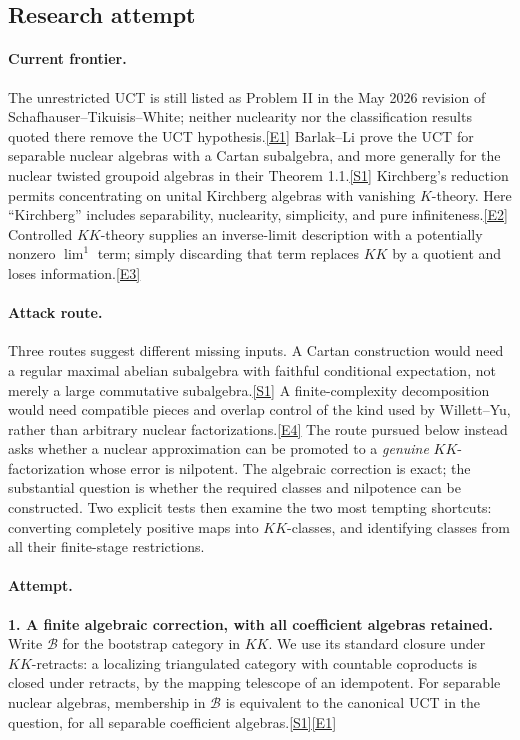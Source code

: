 \documentclass[11pt,a4paper]{article}
\newcommand{\sref}[2]{\hyperlink{source:#1:#2}{[S#2]}}
\newcommand{\eref}[2]{\hyperlink{extra:#1:#2}{[E#2]}}
\begin{document}
\subsection{Research attempt}

\paragraph{Current frontier.}
The unrestricted UCT is still listed as Problem II in the May 2026 revision
of Schafhauser--Tikuisis--White; neither nuclearity nor the classification
results quoted there remove the UCT hypothesis.\eref{statement}{1}
Barlak--Li prove the UCT for separable nuclear algebras with a Cartan
subalgebra, and more generally for the nuclear twisted groupoid algebras
in their Theorem 1.1.\sref{statement}{1}
Kirchberg's reduction permits concentrating on unital Kirchberg algebras
with vanishing $K$-theory. Here ``Kirchberg'' includes separability,
nuclearity, simplicity, and pure infiniteness.\eref{statement}{2}
Controlled $KK$-theory supplies an inverse-limit description with a
potentially nonzero $\lim^1$ term; simply discarding that term replaces
$KK$ by a quotient and loses information.\eref{statement}{3}

\paragraph{Attack route.}
Three routes suggest different missing inputs. A Cartan construction would
need a regular maximal abelian subalgebra with faithful conditional
expectation, not merely a large commutative subalgebra.\sref{statement}{1}
A finite-complexity decomposition would need compatible pieces and overlap
control of the kind used by Willett--Yu, rather than arbitrary nuclear
factorizations.\eref{statement}{4}
The route pursued below instead asks whether a nuclear approximation can
be promoted to a \emph{genuine} $KK$-factorization whose error is nilpotent.
The algebraic correction is exact; the substantial question is whether the
required classes and nilpotence can be constructed. Two explicit tests
then examine the two most tempting shortcuts: converting completely
positive maps into $KK$-classes, and identifying classes from all their
finite-stage restrictions.

\paragraph{Attempt.}
\textbf{1. A finite algebraic correction, with all coefficient algebras retained.}
Write $\mathcal B$ for the bootstrap category in $KK$. We use its standard
closure under $KK$-retracts: a localizing triangulated category with
countable coproducts is closed under retracts, by the mapping telescope of
an idempotent. For separable nuclear algebras, membership in $\mathcal B$
is equivalent to the canonical UCT in the question, for all separable
coefficient algebras.\sref{statement}{1}\eref{statement}{1}
\end{document}
